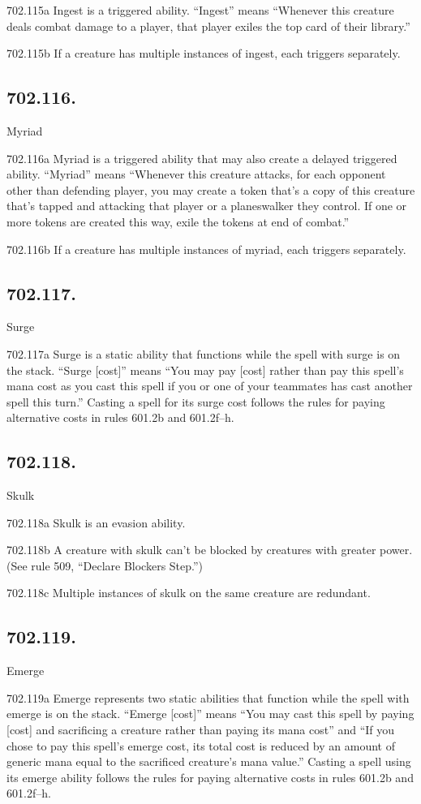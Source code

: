 702.115a Ingest is a triggered ability. “Ingest” means “Whenever this creature deals combat damage to a player, that player exiles the top card of their library.”

702.115b If a creature has multiple instances of ingest, each triggers separately.

\subsection*{702.116.}
Myriad

702.116a Myriad is a triggered ability that may also create a delayed triggered ability. “Myriad” means “Whenever this creature attacks, for each opponent other than defending player, you may create a token that’s a copy of this creature that’s tapped and attacking that player or a planeswalker they control. If one or more tokens are created this way, exile the tokens at end of combat.”

702.116b If a creature has multiple instances of myriad, each triggers separately.

\subsection*{702.117.}
Surge

702.117a Surge is a static ability that functions while the spell with surge is on the stack. “Surge [cost]” means “You may pay [cost] rather than pay this spell’s mana cost as you cast this spell if you or one of your teammates has cast another spell this turn.” Casting a spell for its surge cost follows the rules for paying alternative costs in rules 601.2b and 601.2f–h.

\subsection*{702.118.}
Skulk

702.118a Skulk is an evasion ability.

702.118b A creature with skulk can’t be blocked by creatures with greater power. (See rule 509, “Declare Blockers Step.”)

702.118c Multiple instances of skulk on the same creature are redundant.

\subsection*{702.119.}
Emerge

702.119a Emerge represents two static abilities that function while the spell with emerge is on the stack. “Emerge [cost]” means “You may cast this spell by paying [cost] and sacrificing a creature rather than paying its mana cost” and “If you chose to pay this spell’s emerge cost, its total cost is reduced by an amount of generic mana equal to the sacrificed creature’s mana value.” Casting a spell using its emerge ability follows the rules for paying alternative costs in rules 601.2b and 601.2f–h.

